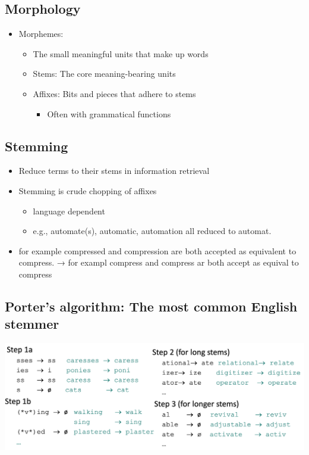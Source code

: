 \documentclass[11pt]{article}
\theoremstyle{definition}
\begin{document}
\subsection{Morphology}
\begin{itemize}
  \item Morphemes:
  \begin{itemize}
    \item The small meaningful units that make up words
    \item Stems: The core meaning-bearing units
    \item Affixes: Bits and pieces that adhere to stems
    \begin{itemize}
      \item Often with grammatical functions
    \end{itemize}
  \end{itemize}
\end{itemize}

\subsection{Stemming}
\begin{itemize}
  \item Reduce terms to their stems in information retrieval
  \item Stemming is crude chopping of affixes
  \begin{itemize}
    \item language dependent
    \item e.g., automate(s), automatic, automation all reduced to automat.
  \end{itemize}
  \item for example compressed
  and compression are both
  accepted as equivalent to
  compress. → for exampl compress and
  compress ar both accept
  as equival to compress
\end{itemize}

\subsection{Porter’s algorithm: 
The most common English stemmer}
\includegraphics[width=\textwidth]{4.png}
\end{document}
